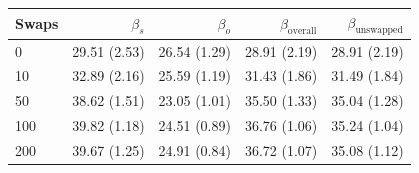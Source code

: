 \begin{table}[H]
\begin{tabular}{l rrrr}
\toprule
Swaps & $\beta_s$ & $\beta_o$ & $\beta_{\mathrm{overall}}$ & $\beta_{\mathrm{unswapped}}$ \\
\midrule
0 & 29.51 (2.53) & 26.54 (1.29) & 28.91 (2.19) & 28.91 (2.19) \\
10 & 32.89 (2.16) & 25.59 (1.19) & 31.43 (1.86) & 31.49 (1.84) \\
50 & 38.62 (1.51) & 23.05 (1.01) & 35.50 (1.33) & 35.04 (1.28) \\
100 & 39.82 (1.18) & 24.51 (0.89) & 36.76 (1.06) & 35.24 (1.04) \\
200 & 39.67 (1.25) & 24.91 (0.84) & 36.72 (1.07) & 35.08 (1.12) \\
\bottomrule
\end{tabular}
\end{table}

